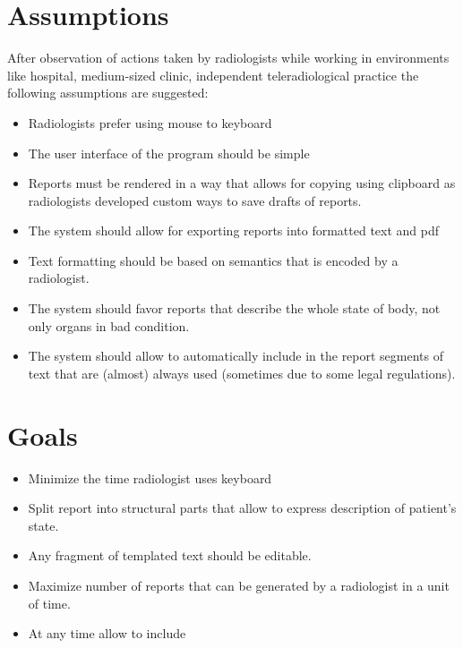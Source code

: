 \documentclass[12pt, twoside, openany]{report}
\theoremstyle{definition}
\begin{document}
\section{Assumptions}
After observation of actions taken by radiologists while working in environments like hospital, medium-sized clinic, independent teleradiological practice the following assumptions are suggested:
\begin{itemize}
	\item Radiologists prefer using mouse to keyboard
	\item The user interface of the program should be simple 
	\item Reports must be rendered in a way that allows for copying using clipboard as radiologists developed custom ways to save drafts of reports.
	\item The system should allow for exporting reports into formatted text and pdf
	\item Text formatting should be based on semantics that is encoded by a radiologist.
	\item The system should favor reports that describe the whole state of body, not only organs in bad condition.
	\item The system should allow to automatically include in the report segments of text that are (almost) always used (sometimes due to some legal regulations).
	
\end{itemize}
\section{Goals}
\begin{itemize}
	\item Minimize the time radiologist uses keyboard
	\item Split report into structural parts that allow to express description of patient's state.
	\item Any fragment of templated text should be editable. 
	\item Maximize number of reports that can be generated by a radiologist in a unit of time.
	\item At any time allow to include
\end{itemize}
\end{document}
